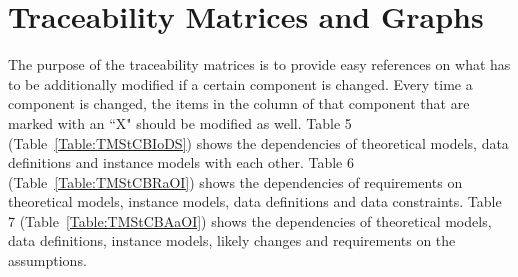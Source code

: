 \documentclass[12pt]{article}
\begin{document}
\section{Traceability Matrices and Graphs}
\label{Sec:TMaG}
The purpose of the traceability matrices is to provide easy references on what has to be additionally modified if a certain component is changed. Every time a component is changed, the items in the column of that component that are marked with an ``X" should be modified as well. Table 5 (Table~\ref{Table:TMStCBIoDS}) shows the dependencies of theoretical models, data definitions and instance models with each other. Table 6 (Table~\ref{Table:TMStCBRaOI}) shows the dependencies of requirements on theoretical models, instance models, data definitions and data constraints. Table 7 (Table~\ref{Table:TMStCBAaOI}) shows the dependencies of theoretical models, data definitions, instance models, likely changes and requirements on the assumptions.
\end{document}
